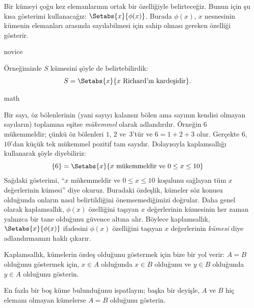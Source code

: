 Bir kümeyi çoğu kez elemanlarının ortak bir özelliğiyle
belirteceğiz. Bunun için şu kısa gösterimi kullanacağız:
$\Setabs{x}{\phi(x)}$. Burada $\phi(x)$, $x$ nesnesinin kümenin elemanları
arasında sayılabilmesi için sahip olması gereken özelliği gösterir.

\begin{tagblock}{novice}
\begin{ex}
Örneğimizde $S$ kümesini şöyle de belirtebilirdik:
\[
S = \Setabs{x}{x \text{ Richard'ın kardeşidir}}.
\]
\end{ex}
\end{tagblock}

\begin{tagblock}{math}
\begin{ex}
Bir sayı, öz bölenlerinin (yani sayıyı kalansız bölen ama sayının kendisi
olmayan sayıların) toplamına eşitse \emph{mükemmel} olarak adlandırılır.
Örneğin $6$ mükemmeldir; çünkü öz bölenleri $1$, $2$ ve~$3$'tür ve
$6 = 1 + 2 + 3$ olur. Gerçekte $6$, $10$'dan küçük tek mükemmel pozitif tam
sayıdır. Dolayısıyla kaplamsallığı
kullanarak şöyle diyebiliriz:
\[
	\{6\} = \Setabs{x}{x\text{ mükemmeldir ve }0 \leq x \leq 10}
\]
Sağdaki gösterimi, ``$x$ mükemmeldir ve $0 \leq x \leq 10$ koşulunu sağlayan
tüm $x$ değerlerinin kümesi'' diye okuruz. Buradaki özdeşlik, kümeler söz
konusu olduğunda onların nasıl belirtildiğini önemsemediğimizi doğrular. Daha
genel olarak kaplamsallık, $\phi(x)$ özelliğini taşıyan $x$ değerlerinin
kümesinin her zaman yalnızca bir tane olduğunu güvence altına alır. Böylece
kaplamsallık, $\Setabs{x}{\phi(x)}$ ifadesini $\phi(x)$ özelliğini taşıyan
$x$ değerlerinin \emph{kümesi} diye adlandırmamızı haklı çıkarır.
\end{ex}
\end{tagblock}

Kaplamsallık, kümelerin özdeş olduğunu göstermek için bize bir yol verir:
$A = B$ olduğunu göstermek için, $x \in A$ olduğunda $x \in B$ olduğunu ve
$y \in B$ olduğunda $y \in A$ olduğunu gösterin.

\begin{prob}
En fazla bir boş küme bulunduğunu ispatlayın; başka bir deyişle, $A$ ve $B$
hiç elemanı olmayan kümelerse $A = B$ olduğunu gösterin.
\end{prob}

